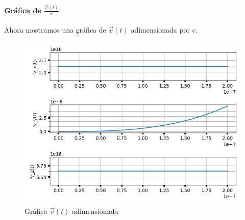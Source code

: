 \newpage 

\paragraph{Gráfica de $\frac{\vec{v}(t)}{c}$}

Ahora mostramos una gráfica de $\vec{v}(t)$ adimensionada por $c$.

\begin{figure}[H]
	\includegraphics[width=\linewidth]{figures/rel_adim_vx_vy_vz.png}
	\caption{Gráfica $\vec{v}(t)$ adimensionada}
	\label{fig:rel_adim_vx_vy_vz}
\end{figure}

